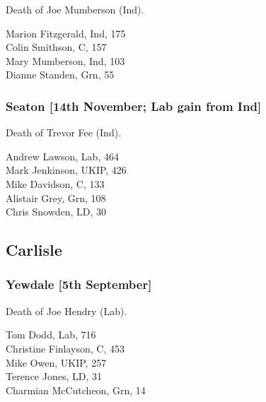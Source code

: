 \documentclass[a4paper,openany,10pt]{book}
\begin{document}
Death of Joe Mumberson (Ind).



Marion Fitzgerald, Ind, 175\\
Colin Smithson, C, 157\\
Mary Mumberson, Ind, 103\\
Dianne Standen, Grn, 55\\


\subsubsection*{Seaton \hspace*{\fill}\nolinebreak[1]%
\enspace\hspace*{\fill}
[14th November; Lab gain from Ind]}


Death of Trevor Fee (Ind).



Andrew Lawson, Lab, 464\\
Mark Jenkinson, UKIP, 426\\
Mike Davidson, C, 133\\
Alistair Grey, Grn, 108\\
Chris Snowden, LD, 30\\


\subsection*{Carlisle}

\subsubsection*{Yewdale \hspace*{\fill}\nolinebreak[1]%
\enspace\hspace*{\fill}
[5th September]}


Death of Joe Hendry (Lab).



Tom Dodd, Lab, 716\\
Christine Finlayson, C, 453\\
Mike Owen, UKIP, 257\\
Terence Jones, LD, 31\\
Charmian McCutcheon, Grn, 14\\
\end{document}

